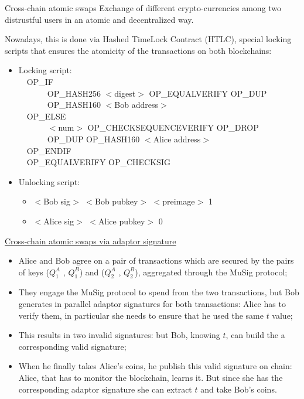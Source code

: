 \documentclass[slidescentered]{beamer}
\begin{document}
	\begin{frame}{Cross-chain atomic swaps}
		Exchange of different crypto-currencies among two distrustful users in an atomic and decentralized way.
		
		\bigskip
		\noindent
		Nowadays, this is done via Hashed TimeLock Contract (HTLC), special locking scripts that ensures the atomicity of the transactions on both blockchains:
		\begin{itemize}
			\item Locking script: \\
			\ \ OP\_IF
			\\
			\ \ \ \ \ \ \ OP\_HASH256 $<$digest$>$ OP\_EQUALVERIFY OP\_DUP \\ 
			\ \ \ \ \ \ \ OP\_HASH160 $<$Bob address$>$ \\
			\ \ OP\_ELSE \\
			\ \ \ \ \ \ \ $<$num$>$ OP\_CHECKSEQUENCEVERIFY OP\_DROP \\ 
			\ \ \ \ \ \ \ OP\_DUP OP\_HASH160 $<$Alice address$>$ \\
			\ \ OP\_ENDIF \\
			\ \ OP\_EQUALVERIFY OP\_CHECKSIG
			\item Unlocking script:
			\begin{itemize}
				\item $<$Bob sig$>$ $<$Bob pubkey$>$ $<$preimage$>$ 1
				\item $<$Alice sig$>$ $<$Alice pubkey$>$ 0
			\end{itemize}
		\end{itemize}
	\end{frame}

	\begin{frame}{\hyperlink{atomic_swap}{Cross-chain atomic swaps via adaptor signature}}
		\begin{itemize}
			\item Alice and Bob agree on a pair of transactions which are secured by the pairs of keys ($Q^A_1$ , $Q^B_1$) and ($Q^A_2$ , $Q^B_2$), aggregated through the MuSig protocol;
			\item They engage the MuSig protocol to spend from the two transactions, but Bob generates in parallel adaptor signatures for both transactions: Alice has to verify them, in particular she needs to ensure that he used the same $t$ value;
			\item This results in two invalid signatures: but Bob, knowing $t$, can build the a corresponding valid signature;
			\item When he finally takes Alice's coins, he publish this valid signature on chain: Alice, that has to monitor the blockchain, learns it. But since she has the corresponding adaptor signature she can extract $t$ and take Bob's coins.
		\end{itemize}
	\end{frame}
\end{document}
